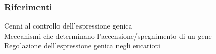 \documentclass[hyperref={pdfpagelabels=false}]{beamer}
\begin{document}
\begin{frame}\frametitle{Riferimenti}
\href{https://github.com/Samnitium/WEB-gene-expression/tree/master/presentazione}{} Cenni al controllo dell'espressione genica\\
\href{https://github.com/Samnitium/WEB-gene-expression/tree/master/presentazione}{} Meccanismi che determinano l'accensione/spegnimento di un gene\\
\href{https://github.com/Samnitium/WEB-gene-expression/tree/master/presentazione}{} Regolazione dell'espressione genica negli eucarioti

\end{frame}
\end{document}
